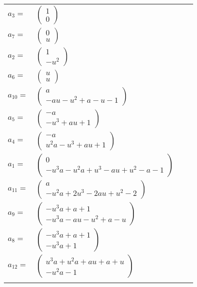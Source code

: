 \documentclass[1p]{elsarticle_modified}
\theoremstyle{definition}
\begin{document}
\begin{tabular}{m{7pt} m{180pt} m{7pt} m{180pt} }
\flushright $a_{3}=$&$\begin{pmatrix}1\\0\end{pmatrix}$ \\
\flushright $a_{7}=$&$\begin{pmatrix}0\\u\end{pmatrix}$ \\
\flushright $a_{2}=$&$\begin{pmatrix}1\\- u^2\end{pmatrix}$ \\
\flushright $a_{6}=$&$\begin{pmatrix}u\\u\end{pmatrix}$ \\
\flushright $a_{10}=$&$\begin{pmatrix}a\\- a u- u^2+a- u-1\end{pmatrix}$ \\
\flushright $a_{5}=$&$\begin{pmatrix}- a\\- u^3+a u+1\end{pmatrix}$ \\
\flushright $a_{4}=$&$\begin{pmatrix}- a\\u^2 a- u^3+a u+1\end{pmatrix}$ \\
\flushright $a_{1}=$&$\begin{pmatrix}0\\- u^3 a- u^2 a+u^3- a u+u^2- a-1\end{pmatrix}$ \\
\flushright $a_{11}=$&$\begin{pmatrix}a\\- u^2 a+2 u^3-2 a u+u^2-2\end{pmatrix}$ \\
\flushright $a_{9}=$&$\begin{pmatrix}- u^3 a+a+1\\- u^3 a- a u- u^2+a- u\end{pmatrix}$ \\
\flushright $a_{8}=$&$\begin{pmatrix}- u^3 a+a+1\\- u^3 a+1\end{pmatrix}$ \\
\flushright $a_{12}=$&$\begin{pmatrix}u^3 a+u^2 a+a u+a+u\\- u^2 a-1\end{pmatrix}$\\&\end{tabular}
\end{document}
